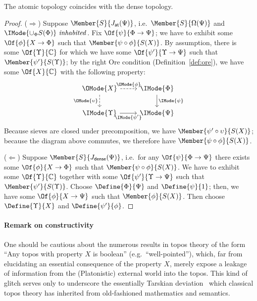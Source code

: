 \documentclass{article}
\newcommand\JAtomic{J_{\mathsf{at}}}
\newcommand\JDense{J_{\mathsf{dense}}}
\newcommand\IsInh[1]{\IMode{#1}\ \mathit{inhabited}}
\begin{document}
\begin{lem}\label{lem:atomic-dense}
  The atomic topology coincides with the dense topology.
\end{lem}
\begin{proof}
  ($\Rightarrow$) Suppose $\Member{S}{\JAtomic(\Psi)}$, i.e.\
  $\Member{S}{\Omega(\Psi)}$ and $\IsInh{\cup_\Phi S(\Phi)}$. Fix
  $\Of{\psi}{\Phi\to\Psi}$; we have to exhibit some
  $\Of{\phi}{X\to\Phi}$ such that $\Member{\psi\circ\phi}{S(X)}$.
  By assumption, there is some $\Of{\Upsilon}{\mathbb{C}}$ for which we
  have some $\Of{\psi'}{\Upsilon\to\Psi}$ such that
  $\Member{\psi'}{S(\Upsilon)}$; by the right Ore condition
  (Definition~\ref{def:ore}), we have some $\Of{X}{\mathbb{C}}$ with
  the following property:
  \[
    \begin{tikzcd}
      \OMode{X}
      \arrow[r,dashed,"\OMode{\phi}"]
      \arrow[d,dashed,swap,"\OMode{\upsilon}"]
      &
      \IMode{\Phi}
      \arrow[d,"\IMode{\psi}"]
      \\
      \IMode{\Upsilon}
      \arrow[r,swap,"\IMode{\psi'}"]
      &
      \IMode{\Psi}
    \end{tikzcd}
  \]
  Because sieves are closed under precomposition, we have
  $\Member{\psi'\circ \upsilon}{S(X)}$; because the diagram above
  commutes, we therefore have $\Member{\psi\circ\phi}{S(X)}$.

  ($\Leftarrow$) Suppose $\Member{S}{\JDense(\Psi)}$, i.e.\ for any
  $\Of{\psi}{\Phi\to\Psi}$ there exists some $\Of{\phi}{X\to\Phi}$
  such that $\Member{\psi\circ\phi}{S(X)}$. We have to exhibit some
  $\Of{\Upsilon}{\mathbb{C}}$ together with some
  $\Of{\psi'}{\Upsilon\to\Psi}$ such that
  $\Member{\psi'}{S(\Upsilon)}$.
  Choose $\Define{\Phi}{\Psi}$ and $\Define{\psi}{1}$; then, we have
  some $\Of{\phi}{X\to\Psi}$ such that $\Member{\phi}{S(X)}$. Then
  choose $\Define{\Upsilon}{X}$ and $\Define{\psi'}{\phi}$.
\end{proof}

\paragraph{Remark on constructivity}

One should be cautious about the numerous results in topos theory of
the form ``Any topos with property $X$ is boolean'' (e.g.\
``well-pointed''), which, far from elucidating an essential
consequence of the property $X$, merely expose a leakage of
information from the (Platonistic) external world into the topos. This
kind of glitch serves only to underscore the essentially Tarskian
deviation~\cite{girard:2011} which classical topos theory has
inherited from old-fashioned mathematics and semantics.
\end{document}
